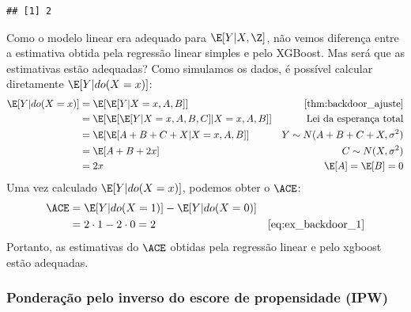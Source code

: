 \begin{example}
\begin{knitrout}
\begin{kframe}
\begin{alltt}
 \hlkwb{=}  \hlstd{,} \hlstd{)} \hlopt{-}
   \hlstd{,} \hlstd{)}
 \hlstd{)}
\end{alltt}
\begin{verbatim}
## [1] 2
\end{verbatim}
\end{kframe}
\end{knitrout}

 Como o modelo linear era adequado para $\E[Y|X,\Z]$,
 não vemos diferença entre a estimativa obtida
 pela regressão linear simples e pelo XGBoost.
 Mas será que as estimativas estão adequadas?
 Como simulamos os dados,
 é possível calcular diretamente $\E[Y|do(X=x)]$:
 \begin{align}
  \label{eq:ex_backdoor_1}
  \E[Y|do(X=x)]
  &= \E[\E[Y|X=x, A, B]]
  & \text{\cref{thm:backdoor_ajuste}} \nonumber \\
  &= \E[\E[\E[Y|X=x, A, B, C]|X=x, A, B]]
  & \text{Lei da esperança total} \nonumber \\
  &= \E[\E[A+B+C+X|X=x, A, B]]
  & Y \sim N(A+B+C+X, \sigma^2) \nonumber \\
  &= \E[A + B + 2x]
  & C \sim N(X, \sigma^2) \nonumber \\
  &= 2x
  & \E[A] = \E[B] = 0
 \end{align}
 Uma vez calculado $\E[Y|do(X=x)]$,
 podemos obter o $\ACE$:
 \begin{align*}
  \ACE
  &= \E[Y|do(X=1)] - \E[Y|do(X=0)] \\
  &= 2 \cdot 1 - 2 \cdot 0 = 2
  & \text{\cref{eq:ex_backdoor_1}}
 \end{align*}
 Portanto, as estimativas do $\ACE$ obtidas 
 pela regressão linear e pelo xgboost 
 estão adequadas.
\end{example}

\subsubsection{Ponderação pelo inverso do escore de propensidade (IPW)}

